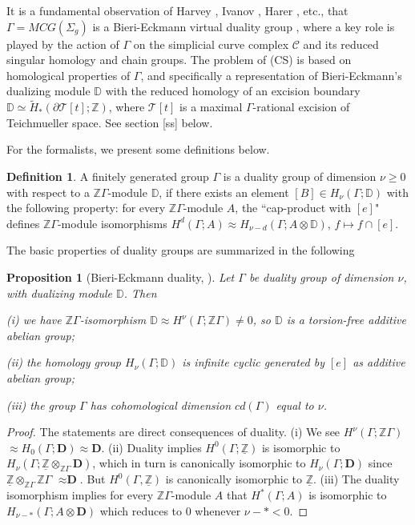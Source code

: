 \documentclass[12pt]{amsart}
\newtheorem{prop}[thm]{Proposition}
\theoremstyle{definition}
\newtheorem{dfn}[thm]{Definition}
\theoremstyle{remark}
\newcommand{\bZ}{\mathbb{Z}}
\newcommand{\del}{\partial}
\newcommand{\bD}{\mathbb{D}}
\newcommand{\sC}{\mathscr{C}}
\newcommand{\sT}{\mathscr{T}}
\begin{document}

It is a fundamental observation of Harvey \cite{Harvey}, Ivanov \cite{ivanov2015virtual}, Harer \cite{Harer1986}, etc., that $\Gamma=MCG(\Sigma_g)$ is a Bieri-Eckmann virtual duality group \cite{BiEck}, where a key role is played by the action of $\Gamma$ on the simplicial curve complex $\sC$ and its reduced singular homology and chain groups. The problem of (CS) is based on homological properties of $\Gamma$, and specifically a representation of Bieri-Eckmann's dualizing module $\bD$ with the reduced homology of an excision boundary $\bD\simeq \tilde{H}_*(\del \sT[t]; \bZ)$, where $\sT[t]$ is a maximal $\Gamma$-rational excision of Teichmueller space. See section [ss] below.

For the formalists, we present some definitions below.
\begin{dfn} 
A finitely generated group $\Gamma$ is a duality group of dimension $\nu \geq 0$ with respect to a $\bZ \Gamma$-module $\bD$, if there exists an element $[B]\in H_\nu(\Gamma; \bD)$ with the following property: for every $\bZ \Gamma$-module $A$, the ``cap-product with $[e]$" defines $\bZ \Gamma$-module isomorphisms $H^d(\Gamma;A) \approx H_{\nu-d}(\Gamma; A \otimes \bD)$, $f\mapsto f\cap [e]$. 
\end{dfn}

The basic properties of duality groups are summarized in the following
\begin{prop}[Bieri-Eckmann duality, \cite{BiEck}] \label{dual1}
Let $\Gamma$ be duality group of dimension $\nu$, with dualizing module $\bD$. Then 

(i) we have $\bZ \Gamma$-isomorphism $\bD \approx H^\nu(\Gamma;\bZ \Gamma) \neq 0$, so $\bD$ is a torsion-free additive abelian group;


(ii) the homology group $H_\nu (\Gamma; \bD)$ is infinite cyclic generated by $[e]$ as additive abelian group; 

(iii) the group $\Gamma$ has cohomological dimension $cd(\Gamma)$ equal to $\nu$.
\end{prop}


\begin{proof} 
The statements are direct consequences of duality. (i) We see $H^\nu(\Gamma; \bZ \Gamma)$ $\approx H_0(\Gamma; \textbf{D})\approx \textbf{D}$. (ii) Duality implies $H^0(\Gamma; \underline{\bZ} )$ is isomorphic to $H_\nu(\Gamma; \underline{\bZ} \otimes_{\bZ \Gamma} \textbf{D})$, which in turn is canonically isomorphic to $H_\nu(\Gamma; \textbf{D})$ since $\underline{\bZ}\otimes_{\bZ \Gamma} \bZ \Gamma$ $\approx \textbf{D}$. But $H^0(\Gamma, \underline{\bZ})$ is canonically isomorphic to $\underline{\bZ}$. (iii) The duality isomorphism implies for every $\bZ \Gamma$-module $A$ that $H^*(\Gamma; A)$ is isomorphic to $H_{\nu-*}(\Gamma; A \otimes \textbf{D})$ which reduces to $0$ whenever $\nu-*<0$.
\end{proof}
\end{document}

